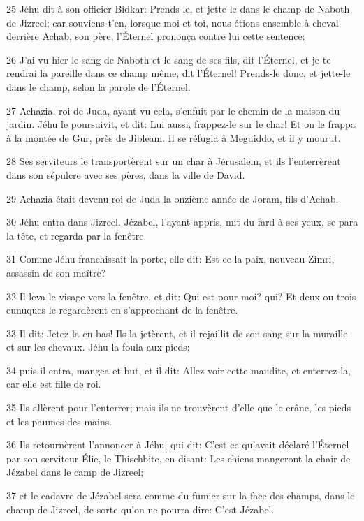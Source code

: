 \par 25 Jéhu dit à son officier Bidkar: Prends-le, et jette-le dans le champ de Naboth de Jizreel; car souviens-t'en, lorsque moi et toi, nous étions ensemble à cheval derrière Achab, son père, l'Éternel prononça contre lui cette sentence:
\par 26 J'ai vu hier le sang de Naboth et le sang de ses fils, dit l'Éternel, et je te rendrai la pareille dans ce champ même, dit l'Éternel! Prends-le donc, et jette-le dans le champ, selon la parole de l'Éternel.
\par 27 Achazia, roi de Juda, ayant vu cela, s'enfuit par le chemin de la maison du jardin. Jéhu le poursuivit, et dit: Lui aussi, frappez-le sur le char! Et on le frappa à la montée de Gur, près de Jibleam. Il se réfugia à Meguiddo, et il y mourut.
\par 28 Ses serviteurs le transportèrent sur un char à Jérusalem, et ils l'enterrèrent dans son sépulcre avec ses pères, dans la ville de David.
\par 29 Achazia était devenu roi de Juda la onzième année de Joram, fils d'Achab.
\par 30 Jéhu entra dans Jizreel. Jézabel, l'ayant appris, mit du fard à ses yeux, se para la tête, et regarda par la fenêtre.
\par 31 Comme Jéhu franchissait la porte, elle dit: Est-ce la paix, nouveau Zimri, assassin de son maître?
\par 32 Il leva le visage vers la fenêtre, et dit: Qui est pour moi? qui? Et deux ou trois eunuques le regardèrent en s'approchant de la fenêtre.
\par 33 Il dit: Jetez-la en bas! Ils la jetèrent, et il rejaillit de son sang sur la muraille et sur les chevaux. Jéhu la foula aux pieds;
\par 34 puis il entra, mangea et but, et il dit: Allez voir cette maudite, et enterrez-la, car elle est fille de roi.
\par 35 Ils allèrent pour l'enterrer; mais ils ne trouvèrent d'elle que le crâne, les pieds et les paumes des mains.
\par 36 Ils retournèrent l'annoncer à Jéhu, qui dit: C'est ce qu'avait déclaré l'Éternel par son serviteur Élie, le Thischbite, en disant: Les chiens mangeront la chair de Jézabel dans le camp de Jizreel;
\par 37 et le cadavre de Jézabel sera comme du fumier sur la face des champs, dans le champ de Jizreel, de sorte qu'on ne pourra dire: C'est Jézabel.

